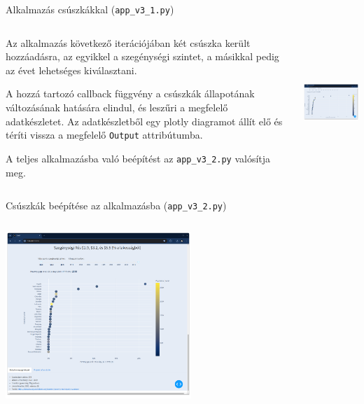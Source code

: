 \documentclass[english, aspectratio=169]{beamer}
\begin{document}
\begin{frame}{Alkalmazás csúszkákkal (\texttt{app\_v3\_1.py})}
	\begin{columns}
		\begin{column}{.5\textwidth}
			Az alkalmazás következő iterációjában két csúszka került hozzáadásra, az egyikkel a szegénységi szintet, a másikkal pedig az évet lehetséges kiválasztani.\par\medskip
			A hozzá tartozó callback függvény a csúszkák állapotának változásának hatására elindul, és leszűri a megfelelő adatkészletet. Az adatkészletből egy plotly diagramot állít elő és téríti vissza a megfelelő \texttt{Output} attribútumba.\par\medskip
			A teljes alkalmazásba való beépítést az \texttt{app\_v3\_2.py} valósítja meg.
		\end{column}
		\begin{column}{.5\textwidth}
			\begin{center}
				\includegraphics[width=7cm, height=5cm]{images/scatter_19.png}
			\end{center}		
		\end{column}
	\end{columns}
\end{frame}

\begin{frame}{Csúszkák beépítése az alkalmazásba (\texttt{app\_v3\_2.py})}
	\begin{center}
		\includegraphics[width=7cm, height=7cm, keepaspectratio]{images/scatter_34.png}
	\end{center}
\end{frame}
\end{document}

